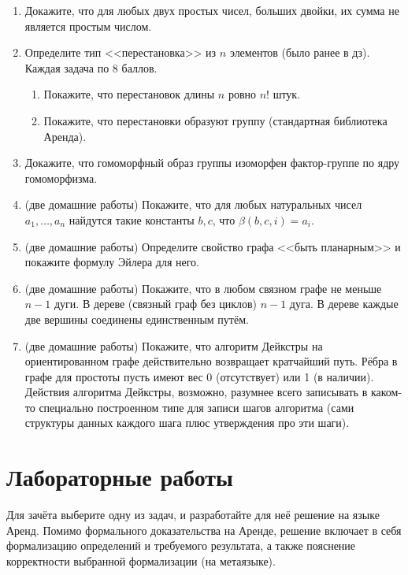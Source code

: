 \documentclass[10pt,a4paper,oneside]{article}
\begin{document}
\begin{enumerate}
\item Докажите, что для любых двух простых чисел, больших двойки, их сумма не является простым числом.

\item Определите тип <<перестановка>> из $n$ элементов (было ранее в дз). Каждая задача по 8 баллов.
\begin{enumerate}
\item Покажите, что перестановок длины $n$ ровно $n!$ штук.
\item Покажите, что перестановки образуют группу (стандартная библиотека Аренда).
\end{enumerate}

\item Докажите, что гомоморфный образ группы изоморфен фактор-группе по ядру гомоморфизма.

\item (две домашние работы) 
Покажите, что для любых натуральных чисел $a_1,\dots,a_n$ найдутся такие константы $b,c$, что $\beta(b,c,i) = a_i$.

\item (две домашние работы) Определите свойство графа <<быть планарным>> и покажите формулу Эйлера для него.

\item (две домашние работы) Покажите, что в любом связном графе не меньше $n-1$ дуги.
В дереве (связный граф без циклов) $n-1$ дуга.
В дереве каждые две вершины соединены единственным путём.

\item (две домашние работы) Покажите, что алгоритм Дейкстры на ориентированном графе действительно возвращает кратчайший путь. Рёбра в графе для простоты
пусть имеют вес 0 (отсутствует) или 1 (в наличии). Действия алгоритма Дейкстры, возможно, разумнее всего записывать в каком-то специально
построенном типе для записи шагов алгоритма (сами структуры данных каждого шага плюс утверждения про эти шаги).
\end{enumerate}

\section*{Лабораторные работы}

Для зачёта выберите одну из задач, и разработайте для неё решение на языке Аренд. Помимо формального
доказательства на Аренде, решение включает в себя формализацию определений и требуемого результата, 
а также пояснение корректности выбранной формализации (на метаязыке).
\end{document}
